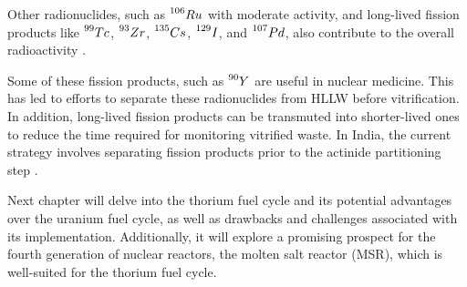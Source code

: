 Other radionuclides, such as \(\prescript{106}{}{Ru}\) with moderate activity, and long-lived fission products like \(\prescript{99}{}{Tc}\), \(\prescript{93}{}{Zr}\), \(\prescript{135}{}{Cs}\), \(\prescript{129}{}{I}\), and \(\prescript{107}{}{Pd}\), also contribute to the overall radioactivity \cite{fuel_cycle_book}.

Some of these fission products, such as \(\prescript{90}{}{Y}\) are useful in nuclear medicine. This has led to efforts to separate these radionuclides from HLLW before vitrification. In addition, long-lived fission products can be transmuted into shorter-lived ones to reduce the time required for monitoring vitrified waste. In India, the current strategy involves separating fission products prior to the actinide partitioning step \cite{fuel_cycle_book}.

Next chapter will delve into the thorium fuel cycle and its potential advantages over the uranium fuel cycle, as well as drawbacks and challenges associated with its implementation. Additionally, it will explore a promising prospect for the fourth generation of nuclear reactors, the molten salt reactor (MSR), which is well-suited for the thorium fuel cycle.